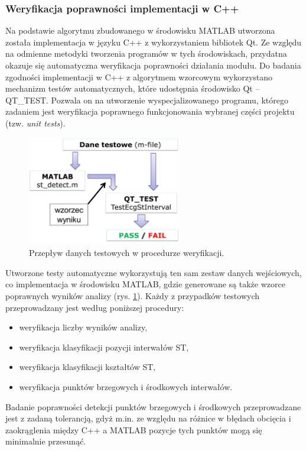 \subsubsection{Weryfikacja poprawności implementacji w C++}
Na podstawie algorytmu zbudowanego w środowisku MATLAB utworzona została implementacja w języku C++ z wykorzystaniem bibliotek Qt. Ze względu na odmienne metodyki tworzenia programów w tych środowiskach, przydatna okazuje się automatyczna weryfikacja poprawności działania modułu.
Do badania zgodności implementacji w C++ z algorytmem wzorcowym wykorzystano mechanizm testów automatycznych, które udostępnia środowisko Qt – QT\_TEST. Pozwala on na utworzenie wyspecjalizowanego programu, którego zadaniem jest weryfikacja poprawnego funkcjonowania wybranej części projektu (tzw. \emph{unit tests}).
\begin{figure}[H]
	\centering
	\includegraphics[width=0.6\textwidth]{ST_INTERVAL/img/ST_weryfikacja.png}
	\caption{Przepływ danych testowych w procedurze weryfikacji.}
	\label{fig:ST_weryfikacja}
\end{figure}
Utworzone testy automatyczne wykorzystują ten sam zestaw danych wejściowych, co implementacja w środowisku MATLAB, gdzie generowane są także wzorce poprawnych wyników analizy (rys. \ref{fig:ST_weryfikacja}). Każdy z przypadków testowych przeprowadzany jest według poniższej procedury:
\begin{itemize}
	\item weryfikacja liczby wyników analizy,
	\item weryfikacja klasyfikacji pozycji interwałów ST,
	\item weryfikacja klasyfikacji kształtów ST,
	\item weryfikacja punktów brzegowych i środkowych interwałów.
\end{itemize}

Badanie poprawności detekcji punktów brzegowych i środkowych przeprowadzane jest z zadaną tolerancją, gdyż m.in. ze względu na różnice w błędach obcięcia i zaokrąglenia między C++ a MATLAB pozycje tych punktów mogą się minimalnie przesunąć.

